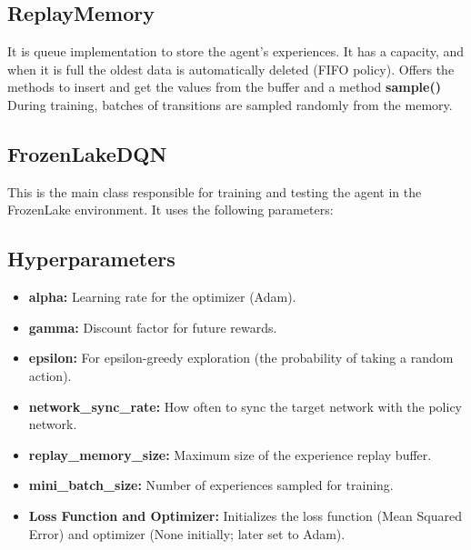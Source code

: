 \subsection{ReplayMemory}\label{sec:replay_memory}
It is queue implementation to store the agent's experiences.
It has a capacity, and when it is full the oldest data is automatically deleted (FIFO policy).
Offers the methods to insert and get the values from the buffer and a method \textbf{sample()} During training, batches of transitions are sampled randomly from the memory.
\subsection{FrozenLakeDQN}
This is the main class responsible for training and testing the agent in the FrozenLake environment.
It uses the following parameters:
\subsection{Hyperparameters}
\begin{itemize}
    \item \textbf{alpha:} Learning rate for the optimizer (Adam).
    \item \textbf{gamma:} Discount factor for future rewards.
    \item \textbf{epsilon:} For epsilon-greedy exploration (the probability of taking a random action).
    \item \textbf{network\_sync\_rate:} How often to sync the target network with the policy network.
    \item \textbf{replay\_memory\_size:} Maximum size of the experience replay buffer.
    \item \textbf{mini\_batch\_size:} Number of experiences sampled for training.
    \item \textbf{Loss Function and Optimizer:} Initializes the loss function (Mean Squared Error) and optimizer (None initially; later set to Adam).
\end{itemize}
